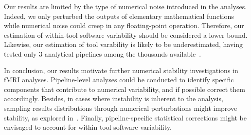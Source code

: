 \documentclass[11pt,onecolumn]{article}
\begin{document}

Our results are limited by the type of numerical noise introduced in the
analyses. Indeed, we only perturbed the outputs of elementary
mathematical functions while numerical noise could creep in any
floating-point operation. Therefore, our estimation of within-tool software variability should
be considered a lower bound. Likewise, our estimation of tool varability is
likely to be underestimated, having tested only 3 analytical pipelines
among the thousands available~\cite{carp2012plurality}.

In conclusion, our results motivate further numerical stability
investigations in fMRI analyses. Pipeline-level analyses could be conducted
to identify specific components that contribute to numerical variability,
and if possible correct them accordingly. Besides, in cases where
instability is inherent to the analysis, sampling results distributions
through numerical perturbations might improve stability, as explored
in~\cite{kiar2021data}. Finally, pipeline-specific statistical corrections
might be envisaged to account for within-tool software variability.




\clearpage
\end{document}
